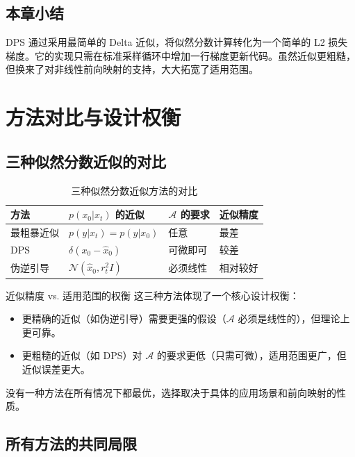 \documentclass[a4paper]{article}
\begin{document}
\subsection{本章小结}

DPS 通过采用最简单的 Delta 近似，将似然分数计算转化为一个简单的 L2 损失梯度。它的实现只需在标准采样循环中增加一行梯度更新代码。虽然近似更粗糙，但换来了对非线性前向映射的支持，大大拓宽了适用范围。


\section{方法对比与设计权衡}

\subsection{三种似然分数近似的对比}

\begin{table}[H]
\centering
\begin{tabular}{p{}p{}p{}p{}}
\toprule
\textbf{方法} & \textbf{$p(x_0|x_t)$ 的近似} & \textbf{$\mathcal{A}$ 的要求} & \textbf{近似精度} \\
\midrule
最粗暴近似 & $p(y|x_t) = p(y|x_0)$ & 任意 & 最差 \\
DPS & $\delta(x_0 - \hat{x}_0)$ & 可微即可 & 较差 \\
伪逆引导 & $\mathcal{N}(\hat{x}_0, r_t^2 I)$ & 必须线性 & 相对较好 \\
\bottomrule
\end{tabular}
\caption{三种似然分数近似方法的对比}
\end{table}

\begin{importantbox}{近似精度 vs. 适用范围的权衡}
这三种方法体现了一个核心设计权衡：
\begin{itemize}
    \item 更精确的近似（如伪逆引导）需要更强的假设（$\mathcal{A}$ 必须是线性的），但理论上更可靠。
    \item 更粗糙的近似（如 DPS）对 $\mathcal{A}$ 的要求更低（只需可微），适用范围更广，但近似误差更大。
\end{itemize}
没有一种方法在所有情况下都最优，选择取决于具体的应用场景和前向映射的性质。
\end{importantbox}

\subsection{所有方法的共同局限}
\end{document}
